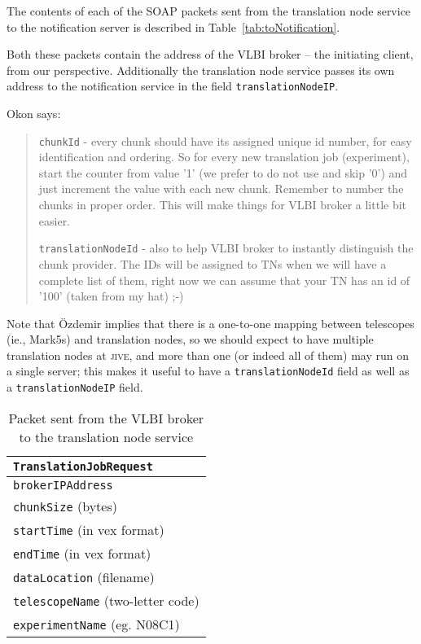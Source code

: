 \documentclass[11pt]{article}
\begin{document}
The contents of each of the SOAP packets sent from the translation node
service to the notification server is described in
Table~\ref{tab:toNotification}.

Both these packets contain the address of the VLBI broker -- the initiating
client, from our perspective.  Additionally the translation node service
passes its own address to the notification service in the field
\texttt{translationNodeIP}.

Okon\cite{okon} says:
\begin{quotation}
\noindent\texttt{chunkId} - every chunk should have its assigned unique
id number, for easy identification and ordering. So for every new
translation job (experiment), start the counter from value '1' (we
prefer to do not use and skip '0') and just increment the value with
each new chunk. Remember to number the chunks in proper order. This will
make things for VLBI broker a little bit easier.

\vspace{0.5\baselineskip}\noindent\texttt{translationNodeId} - also to help VLBI broker
to instantly distinguish the chunk provider. The IDs will be assigned
to TNs when we will have a complete list of them, right now we can
assume that your TN has an id of '100' (taken from my hat) ;-)
\end{quotation}

Note that \"Ozdemir\cite{oz} implies that there is a one-to-one mapping between
telescopes (ie., Mark5s) and translation nodes, so we should expect to
have multiple translation nodes at \textsc{jive}, and more than one (or
indeed all of them) may run on a single server; this makes it useful to
have a \texttt{translationNodeId} field as well as a
\texttt{translationNodeIP} field.

\begin{table}\label{tab:transNodeClient}
\begin{tabular}{l}
\texttt{TranslationJobRequest} \\ \hline
\texttt{brokerIPAddress} \\
\texttt{chunkSize} (bytes) \\
\texttt{startTime} (in vex format) \\
\texttt{endTime} (in vex format) \\
\texttt{dataLocation} (filename) \\
\texttt{telescopeName} (two-letter code) \\
\texttt{experimentName} (eg. N08C1) 
\end{tabular}
\caption{Packet sent from the VLBI broker to the translation node service}
\end{table}
\end{document}
